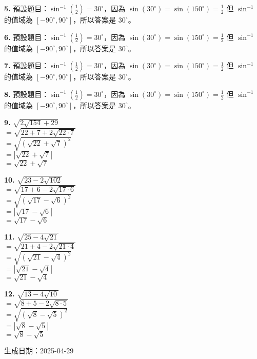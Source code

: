 \documentclass[a4paper,11pt]{article}
\newcommand{\explanationbox}[1]{%
  \begin{tcolorbox}[explanationstyle]
    #1
  \end{tcolorbox}
}
\begin{document}
\begin{multicols}{2}
\explanationbox{\textbf{5.} 預設題目：$\sin^{-1}(\frac{1}{2}) = 30^\circ$，因為 $\sin(30^\circ) = \sin(150^\circ) = \frac{1}{2}$ 但 $\sin^{-1}$ 的值域為 $[-90^\circ, 90^\circ]$，所以答案是 $30^\circ$。}

\explanationbox{\textbf{6.} 預設題目：$\sin^{-1}(\frac{1}{2}) = 30^\circ$，因為 $\sin(30^\circ) = \sin(150^\circ) = \frac{1}{2}$ 但 $\sin^{-1}$ 的值域為 $[-90^\circ, 90^\circ]$，所以答案是 $30^\circ$。}

\explanationbox{\textbf{7.} 預設題目：$\sin^{-1}(\frac{1}{2}) = 30^\circ$，因為 $\sin(30^\circ) = \sin(150^\circ) = \frac{1}{2}$ 但 $\sin^{-1}$ 的值域為 $[-90^\circ, 90^\circ]$，所以答案是 $30^\circ$。}

\explanationbox{\textbf{8.} 預設題目：$\sin^{-1}(\frac{1}{2}) = 30^\circ$，因為 $\sin(30^\circ) = \sin(150^\circ) = \frac{1}{2}$ 但 $\sin^{-1}$ 的值域為 $[-90^\circ, 90^\circ]$，所以答案是 $30^\circ$。}

\explanationbox{\textbf{9.} $\sqrt{2 \sqrt{154} + 29}$ \\ $= \sqrt{22+7 + 2\sqrt{22\cdot7}}$ \\ $= \sqrt{(\sqrt{22} + \sqrt{7})^2}$ \\ $= |\sqrt{22} + \sqrt{7}|$ \\ $= \sqrt{22} + \sqrt{7}$}

\explanationbox{\textbf{10.} $\sqrt{23 - 2 \sqrt{102}}$ \\ $= \sqrt{17+6 - 2\sqrt{17\cdot6}}$ \\ $= \sqrt{(\sqrt{17} - \sqrt{6})^2}$ \\ $= |\sqrt{17} - \sqrt{6}|$ \\ $= \sqrt{17} - \sqrt{6}$}

\explanationbox{\textbf{11.} $\sqrt{25 - 4 \sqrt{21}}$ \\ $= \sqrt{21+4 - 2\sqrt{21\cdot4}}$ \\ $= \sqrt{(\sqrt{21} - \sqrt{4})^2}$ \\ $= |\sqrt{21} - \sqrt{4}|$ \\ $= \sqrt{21} - \sqrt{4}$}

\explanationbox{\textbf{12.} $\sqrt{13 - 4 \sqrt{10}}$ \\ $= \sqrt{8+5 - 2\sqrt{8\cdot5}}$ \\ $= \sqrt{(\sqrt{8} - \sqrt{5})^2}$ \\ $= |\sqrt{8} - \sqrt{5}|$ \\ $= \sqrt{8} - \sqrt{5}$}

\end{multicols}

\vfill
\begin{center}
\small{生成日期：2025-04-29}
\end{center}
\end{document}
